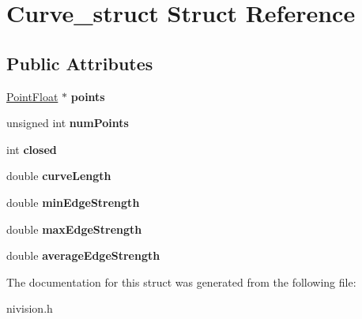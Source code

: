 \hypertarget{structCurve__struct}{
\section{Curve\_\-struct Struct Reference}
\label{structCurve__struct}
}
\subsection*{Public Attributes}
\begin{DoxyCompactItemize}
\item 
\hypertarget{structCurve__struct_ac0f402ddc03efbaf4f6e047e634042d9}{
\hyperlink{structPointFloat__struct}{PointFloat} $\ast$ {\bfseries points}}
\label{structCurve__struct_ac0f402ddc03efbaf4f6e047e634042d9}

\item 
\hypertarget{structCurve__struct_aef2c330735efa4968e30dc8184debf6c}{
unsigned int {\bfseries numPoints}}
\label{structCurve__struct_aef2c330735efa4968e30dc8184debf6c}

\item 
\hypertarget{structCurve__struct_a5a18e1f239023408a4af591f25a4e60f}{
int {\bfseries closed}}
\label{structCurve__struct_a5a18e1f239023408a4af591f25a4e60f}

\item 
\hypertarget{structCurve__struct_af1922ae323af3192fafb8046323d8479}{
double {\bfseries curveLength}}
\label{structCurve__struct_af1922ae323af3192fafb8046323d8479}

\item 
\hypertarget{structCurve__struct_ad3ac85f4d7f2cdbf35a912800ba319ea}{
double {\bfseries minEdgeStrength}}
\label{structCurve__struct_ad3ac85f4d7f2cdbf35a912800ba319ea}

\item 
\hypertarget{structCurve__struct_aaebad88fff0f6222dc5491415f872648}{
double {\bfseries maxEdgeStrength}}
\label{structCurve__struct_aaebad88fff0f6222dc5491415f872648}

\item 
\hypertarget{structCurve__struct_a19032aec878d31f443da03f682c3805f}{
double {\bfseries averageEdgeStrength}}
\label{structCurve__struct_a19032aec878d31f443da03f682c3805f}

\end{DoxyCompactItemize}


The documentation for this struct was generated from the following file:\begin{DoxyCompactItemize}
\item 
nivision.h\end{DoxyCompactItemize}
